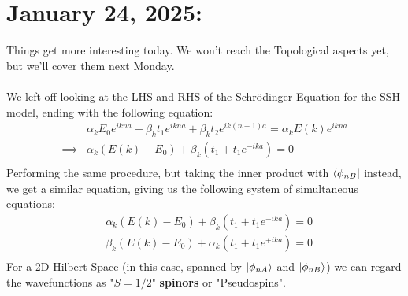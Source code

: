 \documentclass[11pt]{article}
\begin{document}
\pagebreak
\section{January 24, 2025:}

Things get more interesting today. We won't reach the Topological aspects yet, but we'll cover them next Monday.
\\
\\
We left off looking at the LHS and RHS of the Schr\"odinger Equation for the SSH model, ending with the following equation: 
\begin{align*}
  &\alpha_k E_0 e^{ikna} + \beta_k t_1 e^{ikna} + \beta_k t_2 e^{ik(n-1)a} = \alpha_k E(k) e^{ikna} \\
  \implies& \alpha_k (E(k) - E_0) + \beta_k (t_1 + t_1 e^{-ika}) = 0 \\
\end{align*} Performing the same procedure, but taking the inner product with $\langle\phi_{nB}\rvert$ instead, we get a similar equation, giving us the following system of simultaneous equations:
\begin{align*}
  & \alpha_k (E(k) - E_0) + \beta_k (t_1 + t_1 e^{-ika}) = 0 \\ 
  & \beta_k (E(k) - E_0) + \alpha_k (t_1 + t_1 e^{+ika}) = 0 \\ 
\end{align*} For a 2D Hilbert Space (in this case, spanned by $\lvert\phi_{nA}\rangle$ and $\lvert\phi_{nB}\rangle$) we can regard the wavefunctions as "$S = 1/2$" \textbf{spinors} or "Pseudospins". 
\\
\\
\end{document}
